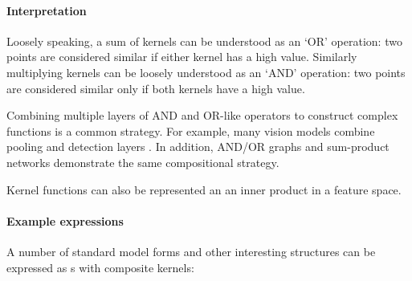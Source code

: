 \documentclass[twoside]{article}
\begin{document}

\paragraph{Interpretation}


Loosely speaking, a sum of kernels can be understood as an `OR' operation: two points are considered similar if either kernel has a high value.
Similarly multiplying kernels can be loosely understood as an `AND' operation: two points are considered similar only if both kernels have a high value.

Combining multiple layers of AND and OR-like operators to construct complex functions is a common strategy.
For example, many vision models combine pooling and detection layers .
In addition, AND/OR graphs  and sum-product networks  demonstrate the same compositional strategy.

Kernel functions can also be represented an an inner product in a feature space.


\paragraph{Example expressions}

A number of standard model forms and other interesting structures can be expressed as \gp{}s with composite kernels:
\end{document}
